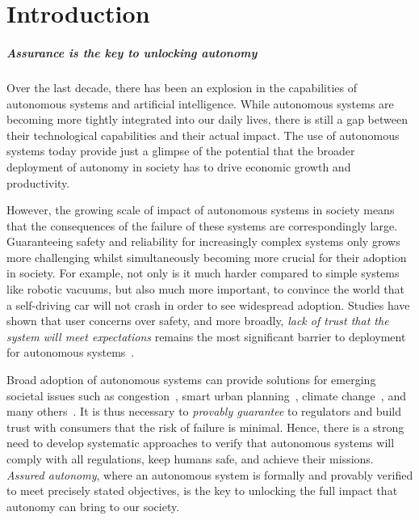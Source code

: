 \chapter{Introduction}

\paragraph{Assurance is the key to unlocking autonomy} Over the last decade, there has been an explosion in the capabilities of autonomous systems and artificial intelligence. While autonomous systems are becoming more tightly integrated into our daily lives, there is still a gap between their technological capabilities and their actual impact. The use of autonomous systems today provide just a glimpse of the potential that the broader deployment of autonomy in society has to drive economic growth and productivity. 



However, the growing scale of impact of autonomous systems in society means that the consequences of the failure of these systems are correspondingly large. Guaranteeing safety and reliability for increasingly complex systems only grows more challenging whilst simultaneously becoming more crucial for their adoption in society. For example, not only is it much harder compared to simple systems like robotic vacuums, but also much more important, to convince the world that a self-driving car will not crash in order to see widespread adoption. Studies have shown that user concerns over safety, and more broadly, \emph{lack of trust that the system will meet expectations} remains the most significant barrier to deployment for autonomous systems~\cite{KAUR201887,BEZAI202165,MOLNAR2018319}.  


Broad adoption of autonomous systems can provide solutions for emerging societal issues such as congestion~\cite{LIORIS2017292,8734238}, smart urban planning~\cite{GULSRUD201885,NITOSLAWSKI2019101770}, climate change~\cite{KOLOKOTSA2017101,goddard2021global}, and many others~\cite{DUONG2020355}. It is thus necessary to \emph{provably guarantee} to regulators and build trust with consumers that the risk of failure is minimal. Hence, there is a strong need to develop systematic approaches to verify that autonomous systems will comply with all regulations, keep humans safe, and achieve their missions. \emph{Assured autonomy}, where an autonomous system is formally and provably verified to meet precisely stated objectives, is the key to unlocking the full impact that autonomy can bring to our society. 

